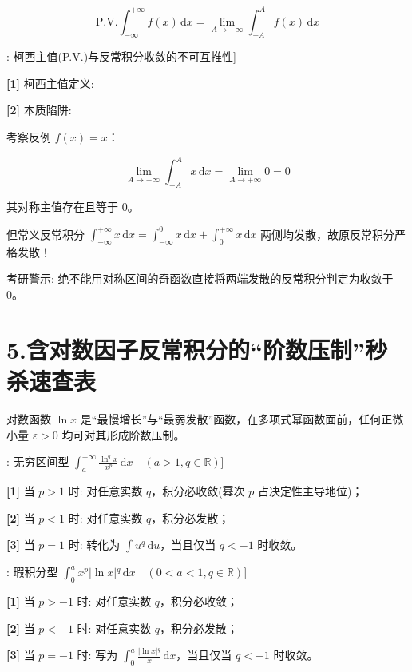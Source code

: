 \documentclass[11pt,a4paper,UTF8]{ctexart}
\begin{document}
\begin{equation*}
\text{P.V.} \int_{-\infty}^{+\infty} f(x)\,\mathrm{d}x = \lim_{A \to +\infty} \int_{-A}^A f(x)\,\mathrm{d}x
\end{equation*}
\begin{thmbox}[原理[1]: 柯西主值(P.V.)与反常积分收敛的不可互推性]

\textbf{[1]} 柯西主值定义:


\textbf{[2]} 本质陷阱:

考察反例 $f(x) = x$：


\begin{equation*}
\lim_{A \to +\infty} \int_{-A}^A x\,\mathrm{d}x = \lim_{A \to +\infty} 0 = 0
\end{equation*}


其对称主值存在且等于 0。

但常义反常积分 $\int_{-\infty}^{+\infty} x\,\mathrm{d}x = \int_{-\infty}^0 x\,\mathrm{d}x + \int_0^{+\infty} x\,\mathrm{d}x$ 两侧均发散，故原反常积分严格发散！

考研警示: 绝不能用对称区间的奇函数直接将两端发散的反常积分判定为收敛于 0。

\end{thmbox}

\section{5.含对数因子反常积分的“阶数压制”秒杀速查表}

对数函数 $\ln x$ 是“最慢增长”与“最弱发散”函数，在多项式幂函数面前，任何正微小量 $\varepsilon > 0$ 均可对其形成阶数压制。

\begin{thmbox}[速查表[1]: 无穷区间型 $\int_a^{+\infty} \frac{\ln^q x}{x^p}\,\mathrm{d}x \quad (a > 1, q \in \mathbb{R})$]

\textbf{[1]} 当 $p > 1$ 时: 对任意实数 $q$，积分必收敛(幂次 $p$ 占决定性主导地位)；

\textbf{[2]} 当 $p < 1$ 时: 对任意实数 $q$，积分必发散；

\textbf{[3]} 当 $p = 1$ 时: 转化为 $\int u^q\,\mathrm{d}u$，当且仅当 $q < -1$ 时收敛。

\end{thmbox}
\begin{thmbox}[速查表[2]: 瑕积分型 $\int_0^a x^p \vert{}\ln x\vert{}^q\,\mathrm{d}x \quad (0 < a < 1, q \in \mathbb{R})$]

\textbf{[1]} 当 $p > -1$ 时: 对任意实数 $q$，积分必收敛；

\textbf{[2]} 当 $p < -1$ 时: 对任意实数 $q$，积分必发散；

\textbf{[3]} 当 $p = -1$ 时: 写为 $\int_0^a \frac{\vert{}\ln x\vert{}^q}{x}\,\mathrm{d}x$，当且仅当 $q < -1$ 时收敛。
\end{thmbox}
\end{document}
